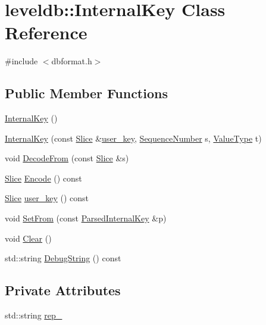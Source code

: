 \hypertarget{classleveldb_1_1_internal_key}{\section{leveldb\-:\-:Internal\-Key Class Reference}
\label{classleveldb_1_1_internal_key}
}


{\ttfamily \#include $<$dbformat.\-h$>$}

\subsection*{Public Member Functions}
\begin{DoxyCompactItemize}
\item 
\hyperlink{classleveldb_1_1_internal_key_a277b997aadb14d0a65314187a1e6adf6}{Internal\-Key} ()
\item 
\hyperlink{classleveldb_1_1_internal_key_af436814d1667db55e93b6bd583619617}{Internal\-Key} (const \hyperlink{classleveldb_1_1_slice}{Slice} \&\hyperlink{classleveldb_1_1_internal_key_a8eeee76862e806006549784fe21fff61}{user\-\_\-key}, \hyperlink{namespaceleveldb_a5481ededd221c36d652c371249f869fa}{Sequence\-Number} s, \hyperlink{namespaceleveldb_acc038cb0d608414730cafa459a4ba866}{Value\-Type} t)
\item 
void \hyperlink{classleveldb_1_1_internal_key_a5a8c9bced0ba968b6b62d91cfb19a82a}{Decode\-From} (const \hyperlink{classleveldb_1_1_slice}{Slice} \&s)
\item 
\hyperlink{classleveldb_1_1_slice}{Slice} \hyperlink{classleveldb_1_1_internal_key_aed986eb7cb360bd6955097235ad267b6}{Encode} () const 
\item 
\hyperlink{classleveldb_1_1_slice}{Slice} \hyperlink{classleveldb_1_1_internal_key_a8eeee76862e806006549784fe21fff61}{user\-\_\-key} () const 
\item 
void \hyperlink{classleveldb_1_1_internal_key_ada9566cd92b6b9784ab7f2f6f71d0a4e}{Set\-From} (const \hyperlink{structleveldb_1_1_parsed_internal_key}{Parsed\-Internal\-Key} \&p)
\item 
void \hyperlink{classleveldb_1_1_internal_key_ab6e9ebec1bf567de89d8dd34fdc51f86}{Clear} ()
\item 
std\-::string \hyperlink{classleveldb_1_1_internal_key_a737053e1b02c3eb8361e960f7fe5befb}{Debug\-String} () const 
\end{DoxyCompactItemize}
\subsection*{Private Attributes}
\begin{DoxyCompactItemize}
\item 
std\-::string \hyperlink{classleveldb_1_1_internal_key_a8962500b3e5c1f7d2fad13eabdb69368}{rep\-\_\-}
\end{DoxyCompactItemize}


